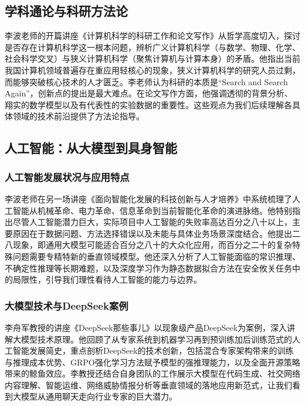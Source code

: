 \documentclass[zihao=-4, linespread=1.5]{ctexart}
\begin{document}
\subsection{学科通论与科研方法论}

李波老师的开篇讲座《计算机科学的科研工作和论文写作》从哲学高度切入，探讨是否存在计算机科学这一根本问题，辨析广义计算机科学（与数学、物理、化学、社会科学交叉）与狭义计算机科学（聚焦计算机与计算本身）的矛盾。他指出当前我国计算机领域普遍存在重应用轻核心的现象，狭义计算机科学的研究人员过剩，而能够突破核心技术的人才匮乏。李老师认为科研的本质是“Search and Search Again”，创新点的提出是最大难点。在论文写作方面，他强调透彻的背景分析、翔实的数学模型以及有代表性的实验数据的重要性。这些观点为我们后续理解各具体领域的技术前沿提供了方法论指导。

\subsection{人工智能：从大模型到具身智能}

\subsubsection{人工智能发展状况与应用特点}

李波老师在另一场讲座《面向智能化发展的科技创新与人才培养》中系统梳理了人工智能从机械革命、电力革命、信息革命到当前智能化革命的演进脉络。他特别指出尽管人工智能潜力巨大，实际项目中人工智能的失败率高达百分之八十以上，主要原因在于数据问题、方法选择错误以及未能与具体业务场景深度结合。他提出二八现象，即通用大模型可能适合百分之八十的大众化应用，而百分之二十的复杂特殊问题需要专精特新的垂直领域模型。他还深入分析了人工智能面临的常识推理、不确定性推理等长期难题，以及深度学习作为静态数据拟合方法在安全攸关任务中的局限性，引导我们理性看待人工智能的能力与边界。

\subsubsection{大模型技术与DeepSeek案例}

李舟军教授的讲座《DeepSeek那些事儿》以现象级产品DeepSeek为案例，深入讲解大模型技术原理。他回顾了从专家系统到机器学习再到预训练加后训练范式的人工智能发展简史，重点剖析DeepSeek的技术创新，包括混合专家架构带来的训练与推理成本优势、GRPO强化学习方法赋予模型的强推理能力，以及全面开源策略带来的鲸鱼效应。李教授还结合自身团队的工作展示大模型在代码生成、社交网络内容理解、智能运维、网络威胁情报分析等垂直领域的落地应用新范式，让我们看到大模型从通用聊天走向行业专家的巨大潜力。
\end{document}

